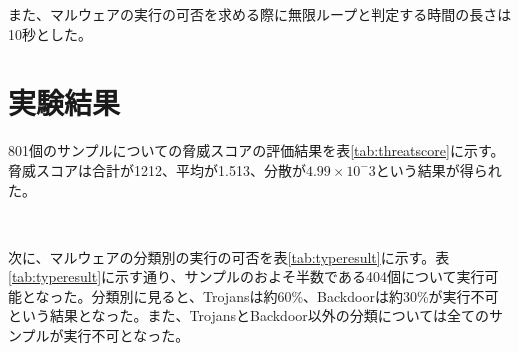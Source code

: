\documentclass[12pt,a4paper,titlepage,report]{jsbook}
\begin{document}
また、マルウェアの実行の可否を求める際に無限ループと判定する時間の長さは10秒とした。


\section{実験結果}
801個のサンプルについての脅威スコアの評価結果を表\ref{tab:threatscore}に示す。脅威スコアは合計が1212、平均が1.513、分散が$4.99\times10^-3$という結果が得られた。

\begin{table}[htbp]
	\caption{脅威スコアの結果}
	\label{tab:threatscore}
	\centering
	\\
\end{table}

次に、マルウェアの分類別の実行の可否を表\ref{tab:typeresult}に示す。表\ref{tab:typeresult}に示す通り、サンプルのおよそ半数である404個について実行可能となった。分類別に見ると、Trojansは約60\%、Backdoorは約30\%が実行不可という結果となった。また、TrojansとBackdoor以外の分類については全てのサンプルが実行不可となった。

\begin{table}[htbp]
	\caption{マルウェアの分類別の実行の可否}
	\label{tab:typeresult}
	\centering
	\\
\end{table}
\end{document}
